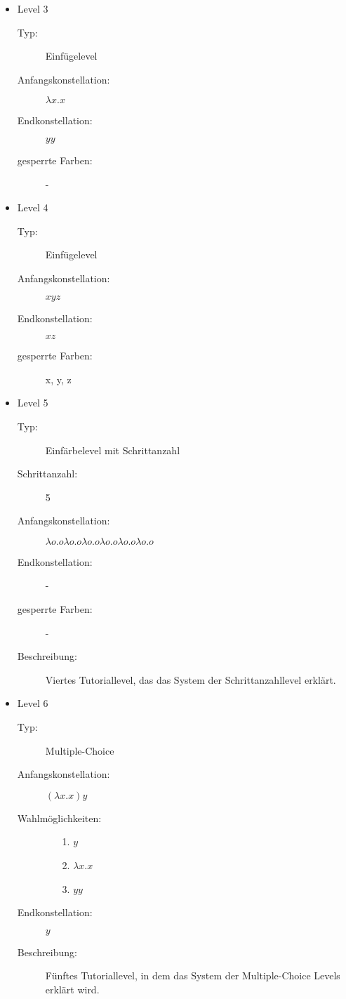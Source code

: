 \documentclass[parskip=full]{scrreprt}
\begin{document}
\begin{itemize}
	\item{Level 3} 
		\begin{description}
			\item[Typ:] Einfügelevel
			\item[Anfangskonstellation:] \(\lambda x . x \)    
			\item[Endkonstellation:] \(y y\)
			\item[gesperrte Farben:] - 
		\end{description}

	\item{Level 4} 
		\begin{description}
			\item[Typ:] Einfügelevel
			\item[Anfangskonstellation:] \(x y z\)    
			\item[Endkonstellation:]  \(x z\)
			\item[gesperrte Farben:] x, y, z
		\end{description}

	\item{Level 5} 
		\begin{description}
			\item[Typ:] Einfärbelevel mit Schrittanzahl
			\item[Schrittanzahl:] 5
			\item[Anfangskonstellation:] \(\lambda o . o   \lambda o . o  \lambda o . o   \lambda o . o  \lambda o . o   \lambda o . o \) 
			\item[Endkonstellation:]  -
			\item[gesperrte Farben:] -
			\item[Beschreibung:] Viertes Tutoriallevel, das das System der Schrittanzahllevel erklärt.
		\end{description}

	\item{Level 6} 
		\begin{description}
			\item[Typ:] Multiple-Choice 
			\item[Anfangskonstellation:] \((\lambda x . x ) y\)    
			\item[Wahlmöglichkeiten:] \hfill
				\begin{itemize}
					\item[1.] \(y\)
					\item[2.] \(\lambda x . x \) 
					\item[3.] \(y y\)
				\end{itemize}
			\item[Endkonstellation:] \(y\)
			\item[Beschreibung:] Fünftes Tutoriallevel, in dem das System der Multiple-Choice Levels erklärt wird.
		\end{description}


\end{itemize}
\end{document}
